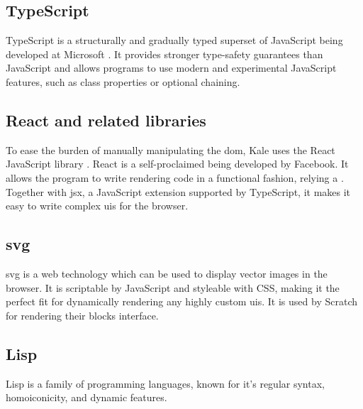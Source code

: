 \subsection{TypeScript}
TypeScript is a structurally and gradually typed superset of JavaScript being
developed at Microsoft \citep{Typescript}. It provides stronger type-safety
guarantees than JavaScript and allows programs to use modern and experimental
JavaScript features, such as class properties or optional chaining. 


\subsection{React and related libraries}
To ease the burden of manually manipulating the \ac{dom}, Kale uses the React
JavaScript library \citep{React}. React is a self-proclaimed  being developed by Facebook. It
allows the program to write rendering
code in a functional fashion, relying a . Together with \ac{jsx}, a JavaScript extension supported by
TypeScript, it makes it easy to write complex \acp{ui} for the browser.

\subsection{\acf{svg}}
\ac{svg} is a web technology which can be used to display vector images in the
browser. It is scriptable by JavaScript and styleable with CSS, making it the
perfect fit for dynamically rendering any highly custom \acp{ui}. It is used by
Scratch for rendering their blocks interface.

\subsection{Lisp}
Lisp is a family of programming languages, known for it's regular syntax,
homoiconicity, and dynamic features.
